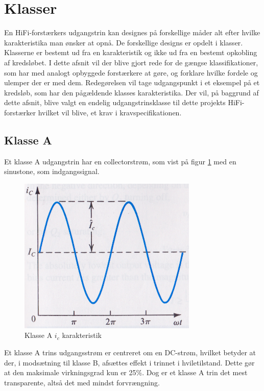 \section{Klasser}
\label{klasser}
En HiFi-forstærkers udgangstrin kan designes på forskellige måder alt efter hvilke karakteristika man ønsker at opnå. De forskellige designs er opdelt i klasser. Klasserne er bestemt ud fra en karakteristik og ikke ud fra en bestemt opkobling af kredsløbet. 
I dette afsnit vil der blive gjort rede for de gængse klassifikationer, som har med analogt opbyggede forstærkere at gøre, og forklare hvilke fordele og ulemper der er med dem. Redegørelsen vil tage udgangspunkt i et eksempel på et kredsløb, som har den pågældende klasses karakteristika. 
Der vil, på baggrund af dette afsnit, blive valgt en endelig udgangstrinsklasse til dette projekts HiFi-forstærker hvilket vil blive, et krav i kravspecifikationen.

\subsection{Klasse A}

Et klasse A udgangstrin har en collectorstrøm, som vist på figur \ref{fig:klassea} med en sinustone, som indgangssignal. 

\begin{figure}[h]
\centering
\includegraphics[scale=.35]{indledende_analyse/klasser/klassea.png}
\caption{Klasse A $i_c$ karakteristik}
\label{fig:klassea}
\end{figure}

Et klasse A trins udgangsstrøm er centreret om en DC-strøm, hvilket betyder at der, i modsætning til klasse B, afsættes effekt i trinnet i hviletilstand. Dette gør at den maksimale virkningsgrad kun er 25\%. Dog er et klasse A trin det mest transparente, altså det med mindst forvrængning.

